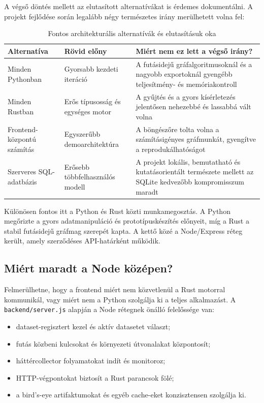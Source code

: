 ﻿\documentclass[a4paper,12pt]{report}
\begin{document}
A végső döntés mellett az elutasított alternatívákat is érdemes dokumentálni. A projekt fejlődése során legalább négy természetes irány merülhetett volna fel:

\begin{table}[H]
\centering
\caption{Fontos architekturális alternatívák és elutasításuk oka}
\begin{tabularx}{\textwidth}{>{\raggedright\arraybackslash}p{3.5cm} >{\raggedright\arraybackslash}p{3.6cm} X}
\toprule
\textbf{Alternatíva} & \textbf{Rövid előny} & \textbf{Miért nem ez lett a végső irány?} \\
\midrule
Minden Pythonban & Gyorsabb kezdeti iteráció & A futásidejű gráfalgoritmusoknál és a nagyobb exportoknál gyengébb teljesítmény- és memóriakontroll \\
Minden Rustban & Erős típusosság és egységes motor & A gyűjtés és a gyors kísérletezés jelentősen nehezebbé és lassabbá vált volna \\
Frontend-központú számítás & Egyszerűbb demoarchitektúra & A böngészőre tolta volna a számításigényes gráfmunkát, gyengítve a reprodukálhatóságot \\
Szerveres SQL-adatbázis & Erősebb többfelhasználós modell & A projekt lokális, bemutatható és kutatásorientált természete mellett az SQLite kedvezőbb kompromisszum maradt \\
\bottomrule
\end{tabularx}
\end{table}

Különösen fontos itt a Python és Rust közti munkamegosztás. A Python megőrizte a gyors adatmanipuláció és prototípuskészítés előnyeit, míg a Rust a stabil futásidejű gráfmag szerepét kapta. A kettő közé a Node/Express réteg került, amely szerződéses API-határként működik.

\subsection{Miért maradt a Node középen?}

Felmerülhetne, hogy a frontend miért nem közvetlenül a Rust motorral kommunikál, vagy miért nem a Python szolgálja ki a teljes alkalmazást. A \texttt{backend/server.js} alapján a Node rétegnek önálló felelőssége van:

\begin{itemize}
    \item dataset-regisztert kezel és aktív datasetet választ;
    \item futás közbeni kulcsokat és környezeti útvonalakat központosít;
    \item háttércollector folyamatokat indít és monitoroz;
    \item HTTP-végpontokat biztosít a Rust parancsok fölé;
    \item a bird's-eye artifaktumokat és egyéb cache-eket konzisztensen szolgálja ki.
\end{itemize}
\end{document}

